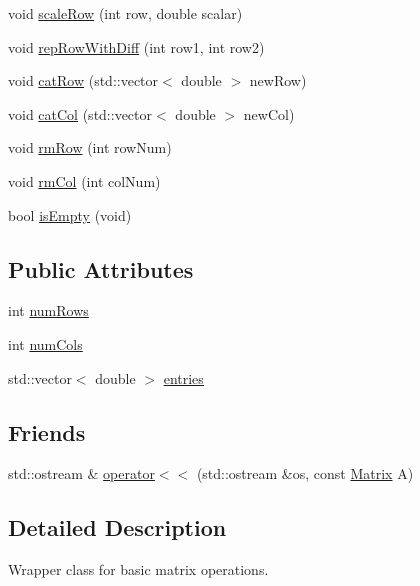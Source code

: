 \begin{DoxyCompactItemize}
\item 
void \mbox{\hyperlink{class_matrix_a37dba2b6d455b7d44ced045ce97a9e05}{scale\+Row}} (int row, double scalar)
\item 
void \mbox{\hyperlink{class_matrix_a1385f13513c2f00cf9dbe9eb45ccbc01}{rep\+Row\+With\+Diff}} (int row1, int row2)
\item 
void \mbox{\hyperlink{class_matrix_a8e3776c15fa1abfd2ffcbd593098131f}{cat\+Row}} (std\+::vector$<$ double $>$ new\+Row)
\item 
void \mbox{\hyperlink{class_matrix_a1d288589b025eb2dad477b9699a79e9f}{cat\+Col}} (std\+::vector$<$ double $>$ new\+Col)
\item 
void \mbox{\hyperlink{class_matrix_aab389448930cfd4b32158aa58ef5f87a}{rm\+Row}} (int row\+Num)
\item 
void \mbox{\hyperlink{class_matrix_ac47f9d15d021312e0a33a341cc1e8032}{rm\+Col}} (int col\+Num)
\item 
bool \mbox{\hyperlink{class_matrix_a8001c85cc9d6a706e659f972ea35ff93}{is\+Empty}} (void)
\end{DoxyCompactItemize}
\subsection*{Public Attributes}
\begin{DoxyCompactItemize}
\item 
int \mbox{\hyperlink{class_matrix_a0eb658c64c749da9cc9705dc232fcb85}{num\+Rows}}
\item 
int \mbox{\hyperlink{class_matrix_a1ddb385f8482c80f98e5cdbf914ba11a}{num\+Cols}}
\item 
std\+::vector$<$ double $>$ \mbox{\hyperlink{class_matrix_aac8f997f1cfa7b0a0ed1d11b554a8c24}{entries}}
\end{DoxyCompactItemize}
\subsection*{Friends}
\begin{DoxyCompactItemize}
\item 
std\+::ostream \& \mbox{\hyperlink{class_matrix_ac7214274c9ef83ebef022af7225ac068}{operator$<$$<$}} (std\+::ostream \&os, const \mbox{\hyperlink{class_matrix}{Matrix}} A)
\end{DoxyCompactItemize}


\subsection{Detailed Description}
Wrapper class for basic matrix operations. 

